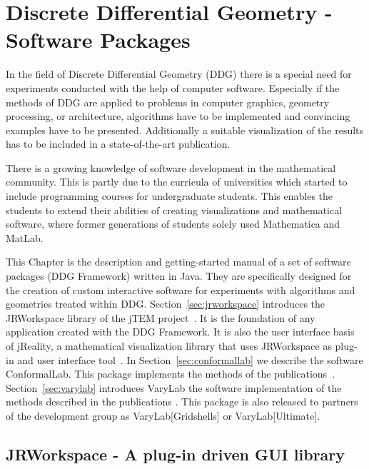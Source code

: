 \chapter{Discrete Differential Geometry - Software Packages}

In the field of Discrete Differential Geometry (DDG) there is a special need for experiments
conducted with the help of computer software. Especially if the methods of DDG are applied
to problems in computer graphics, geometry processing, or architecture, algorithms have 
to be implemented and convincing examples have to be presented. Additionally a suitable 
visualization of the results has to be included in a state-of-the-art publication.

There is a growing knowledge of software development in the mathematical community. This 
is partly due to the curricula of universities which started to include programming courses for undergraduate students.
This enables the students to extend their abilities of creating visualizations and mathematical software, where former generations of students solely used Mathematica and MatLab.

This Chapter is the description and getting-started manual of a set of software packages
(DDG Framework) written in Java. They are specifically designed for the creation of custom interactive software
for experiments with algorithms and geometries treated within DDG. 
Section~\ref{sec:jrworkspace} introduces the {\sc JRWorkspace} library of the {\sc jTEM} project~\cite{JtemWebsite}.
It is the foundation of any application created with the DDG Framework. It is also the user interface basis of {\sc jReality}, a mathematical visualization library that uses {\sc JRWorkspace} as plug-in and user interface tool~\cite{JrealityWebsite}. In Section~\ref{sec:conformallab} we describe the software {\sc ConformalLab}. This package
implements the methods of the publications~\cite{Bobenko2010, OWR2012, Sechelmann2012, BobSechSpr}.
Section~\ref{sec:varylab} introduces {\sc VaryLab} the software implementation of the methods described in the publications \cite{Lafuente2011, Lafuente2012, Sechelmann2012}.
This package is also released to partners of the development group as {\sc VaryLab[Gridshells]} or {\sc VaryLab[Ultimate]}.


\section{{\sc JRWorkspace} - A plug-in driven GUI library}

